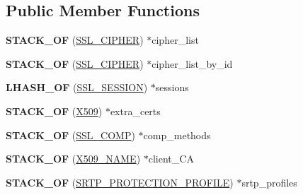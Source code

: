 \subsection*{Public Member Functions}
\begin{DoxyCompactItemize}
\item 
\mbox{\label{structssl__ctx__st_a62061de7026e624a2a1356e74a44a4ca}} 
{\bfseries S\+T\+A\+C\+K\+\_\+\+OF} (\hyperlink{structssl__cipher__st}{S\+S\+L\+\_\+\+C\+I\+P\+H\+ER}) $\ast$cipher\+\_\+list
\item 
\mbox{\label{structssl__ctx__st_a32884086c2e3b6c6d01150922bae386c}} 
{\bfseries S\+T\+A\+C\+K\+\_\+\+OF} (\hyperlink{structssl__cipher__st}{S\+S\+L\+\_\+\+C\+I\+P\+H\+ER}) $\ast$cipher\+\_\+list\+\_\+by\+\_\+id
\item 
\mbox{\label{structssl__ctx__st_a53788edd2eba014536921c5ffe057936}} 
{\bfseries L\+H\+A\+S\+H\+\_\+\+OF} (\hyperlink{structssl__session__st}{S\+S\+L\+\_\+\+S\+E\+S\+S\+I\+ON}) $\ast$sessions
\item 
\mbox{\label{structssl__ctx__st_a9dce1e57755c737a3ba1718e7a8ec87a}} 
{\bfseries S\+T\+A\+C\+K\+\_\+\+OF} (\hyperlink{structx509__st}{X509}) $\ast$extra\+\_\+certs
\item 
\mbox{\label{structssl__ctx__st_a26d1f02658b67ee5eaf0153aa960fa08}} 
{\bfseries S\+T\+A\+C\+K\+\_\+\+OF} (\hyperlink{structssl__comp__st}{S\+S\+L\+\_\+\+C\+O\+MP}) $\ast$comp\+\_\+methods
\item 
\mbox{\label{structssl__ctx__st_a0b201e977f8d6f8262d9060d5a00dc09}} 
{\bfseries S\+T\+A\+C\+K\+\_\+\+OF} (\hyperlink{structX509__name__st}{X509\+\_\+\+N\+A\+ME}) $\ast$client\+\_\+\+CA
\item 
\mbox{\label{structssl__ctx__st_a80ae0543e14a7a480190ab64c34bb32a}} 
{\bfseries S\+T\+A\+C\+K\+\_\+\+OF} (\hyperlink{structsrtp__protection__profile__st}{S\+R\+T\+P\+\_\+\+P\+R\+O\+T\+E\+C\+T\+I\+O\+N\+\_\+\+P\+R\+O\+F\+I\+LE}) $\ast$srtp\+\_\+profiles
\end{DoxyCompactItemize}
